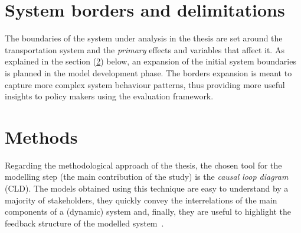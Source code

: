 \section{System borders and delimitations}
\label{s:system-borders}
The boundaries of the system under analysis in the thesis are set around the transportation system and the \textit{primary} effects and variables that affect it. As explained in the  section (\ref{s:methods}) below, an expansion of the initial system boundaries is planned in the model development phase. The borders expansion is meant to capture more complex system behaviour patterns, thus providing more useful insights to policy makers using the evaluation framework.

\section{Methods}
\label{s:methods}
Regarding the methodological approach of the thesis, the chosen tool for the modelling step (the main contribution of the study) is the \textit{causal loop diagram} (CLD). The models obtained using this technique are easy to understand by a majority of stakeholders, they quickly convey the interrelations of the main components of a (dynamic) system and, finally, they are useful to highlight the feedback structure of the modelled system~\parencite{ghosh2015dynamic}.

